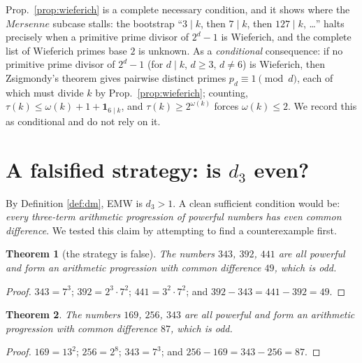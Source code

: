 \documentclass[11pt]{article}
\newtheorem{theorem}{Theorem}[section]
\theoremstyle{definition}
\begin{document}
\begin{remark}
Prop.~\ref{prop:wieferich} is a complete necessary condition, and it shows where the
$Mersenne$ subcase stalls: the bootstrap ``$3\mid k$, then $7\mid k$, then
$127\mid k$, \dots'' halts precisely when a primitive prime divisor of $2^d-1$ is
Wieferich, and the complete list of Wieferich primes base $2$ is unknown. As a
\emph{conditional} consequence: if no primitive prime divisor of $2^d-1$ (for
$d\mid k$, $d\ge3$, $d\ne6$) is Wieferich, then Zsigmondy's theorem gives pairwise
distinct primes $p_d\equiv1\pmod d$, each of which must divide $k$ by
Prop.~\ref{prop:wieferich}; counting, $\tau(k)\le\omega(k)+1+\mathbf 1_{6\mid k}$,
and $\tau(k)\ge2^{\omega(k)}$ forces $\omega(k)\le2$. We record this as conditional
and do not rely on it.
\end{remark}

\section{A falsified strategy: is $d_3$ even?}\label{sec:oddex}

By Definition \ref{def:dm}, EMW is $d_3>1$. A clean sufficient condition would be:
\emph{every three-term arithmetic progression of powerful numbers has even common
difference}. We tested this claim by attempting to find a counterexample first.

\begin{theorem}[the strategy is false]\label{thm:oddex}
The numbers $343$, $392$, $441$ are all powerful and form an arithmetic progression
with common difference $49$, which is odd.
\end{theorem}

\begin{proof}
$343=7^3$; $392=2^3\cdot7^2$; $441=3^2\cdot7^2$; and $392-343=441-392=49$.
\end{proof}

\begin{theorem}\label{thm:oddex2}
The numbers $169$, $256$, $343$ are all powerful and form an arithmetic progression
with common difference $87$, which is odd.
\end{theorem}

\begin{proof}
$169=13^2$; $256=2^8$; $343=7^3$; and $256-169=343-256=87$.
\end{proof}
\end{document}
